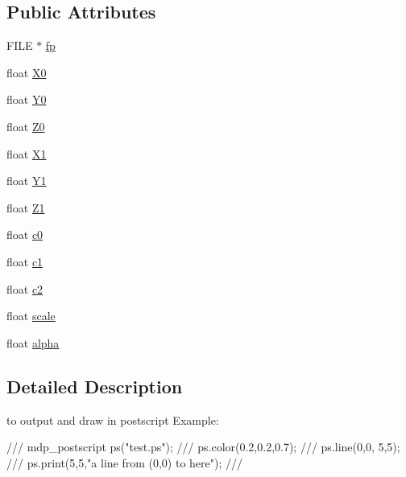 \subsection*{Public Attributes}
\begin{DoxyCompactItemize}
\item 
FILE $\ast$ \hyperlink{classmdp__postscript_a0d313085dea47b974fdd18ecb26622f1}{fp}
\item 
float \hyperlink{classmdp__postscript_a535f3c0036f5d89c139b003c0e909eed}{X0}
\item 
float \hyperlink{classmdp__postscript_acce7497a1e20c1c98708b95041faa274}{Y0}
\item 
float \hyperlink{classmdp__postscript_a5c27b031c6f79593b476dfa6a69e146f}{Z0}
\item 
float \hyperlink{classmdp__postscript_a71402d65d648f4c878dfe5eb74679efa}{X1}
\item 
float \hyperlink{classmdp__postscript_a812d1985306950bed3a2d858e8236b5b}{Y1}
\item 
float \hyperlink{classmdp__postscript_ac512287091dcecae1a549d005083554f}{Z1}
\item 
float \hyperlink{classmdp__postscript_a3160a1940a9fa4e99a0b138bc88769e9}{c0}
\item 
float \hyperlink{classmdp__postscript_a92dc6ce50f362fe93a1981b9a126073a}{c1}
\item 
float \hyperlink{classmdp__postscript_a26f42cf1f154707c463ecdd3f19f568f}{c2}
\item 
float \hyperlink{classmdp__postscript_ae0bd063ba78d27ad7ce541e78f512d3a}{scale}
\item 
float \hyperlink{classmdp__postscript_aca4cc1e7bee7fa702c643bdb1c69d6d0}{alpha}
\end{DoxyCompactItemize}


\subsection{Detailed Description}
to output and draw in postscript Example: \begin{DoxyVerb}
///    mdp_postscript ps("test.ps");
///    ps.color(0.2,0.2,0.7);
///    ps.line(0,0,  5,5);
///    ps.print(5,5,"a line from (0,0) to here");
/// \end{DoxyVerb}
 

